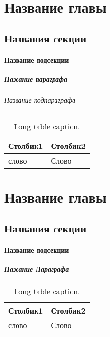 \chapter{Название главы}
  \section{Названия секции}
    \subsubsection{Название подсекции}
      \paragraph{Название параграфа}
        \subparagraph{Название подпараграфа}
          \lipsum[2]\cite{BibExampleRU}
          \begin{center}
            \begin{xltabular}{\linewidth}{|l|X|}
              \caption{Long table caption.\label{long}}                                                                                                    \\
              \hline
              Столбик1  & Столбик2    \\
              \hline
              слово     & Слово       \\
              \hline
            \end{xltabular}
          \end{center}


\chapter{Название главы}
  \section{Названия секции}
    \subsubsection{Название подсекции}
      \paragraph{Название Параграфа}
        \lipsum[2]\cite{BibExampleRU}

        \begin{center}
          \begin{xltabular}{\linewidth}{|l|X|}
            \caption{Long table caption.\label{long}}                                                                                                    \\
            \hline
            Столбик1  & Столбик2    \\
            \hline
            слово     & Слово       \\
            \hline
          \end{xltabular}
        \end{center}

